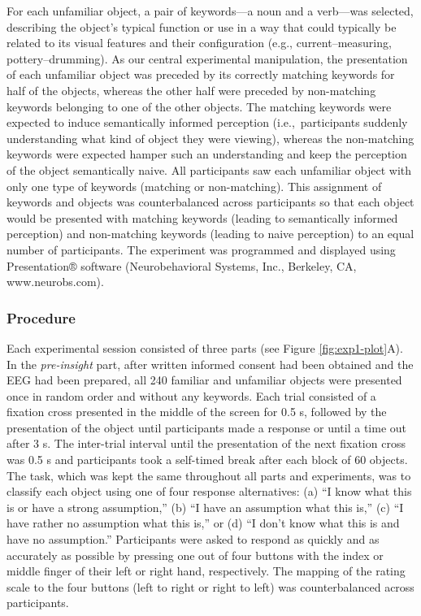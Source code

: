 \documentclass[
  english,
  doc,12pt,twoside,floatsintext]{apa7}
\begin{document}
For each unfamiliar object, a pair of keywords---a noun and a verb---was selected, describing the object's typical function or use in a way that could typically be related to its visual features and their configuration (e.g., current--measuring, pottery--drumming). As our central experimental manipulation, the presentation of each unfamiliar object was preceded by its correctly matching keywords for half of the objects, whereas the other half were preceded by non-matching keywords belonging to one of the other objects. The matching keywords were expected to induce semantically informed perception (i.e.,~participants suddenly understanding what kind of object they were viewing), whereas the non-matching keywords were expected hamper such an understanding and keep the perception of the object semantically naive. All participants saw each unfamiliar object with only one type of keywords (matching or non-matching). This assignment of keywords and objects was counterbalanced across participants so that each object would be presented with matching keywords (leading to semantically informed perception) and non-matching keywords (leading to naive perception) to an equal number of participants. The experiment was programmed and displayed using Presentation® software (Neurobehavioral Systems, Inc., Berkeley, CA, www.neurobs.com).

\hypertarget{procedure}{%
\subsubsection{Procedure}\label{procedure}}

Each experimental session consisted of three parts (see Figure \ref{fig:exp1-plot}A). In the \emph{pre-insight} part, after written informed consent had been obtained and the EEG had been prepared, all 240 familiar and unfamiliar objects were presented once in random order and without any keywords. Each trial consisted of a fixation cross presented in the middle of the screen for 0.5 s, followed by the presentation of the object until participants made a response or until a time out after 3 s. The inter-trial interval until the presentation of the next fixation cross was 0.5 s and participants took a self-timed break after each block of 60 objects. The task, which was kept the same throughout all parts and experiments, was to classify each object using one of four response alternatives: (a) ``I know what this is or have a strong assumption,'' (b) ``I have an assumption what this is,'' (c) ``I have rather no assumption what this is,'' or (d) ``I don't know what this is and have no assumption.'' Participants were asked to respond as quickly and as accurately as possible by pressing one out of four buttons with the index or middle finger of their left or right hand, respectively. The mapping of the rating scale to the four buttons (left to right or right to left) was counterbalanced across participants.
\end{document}
